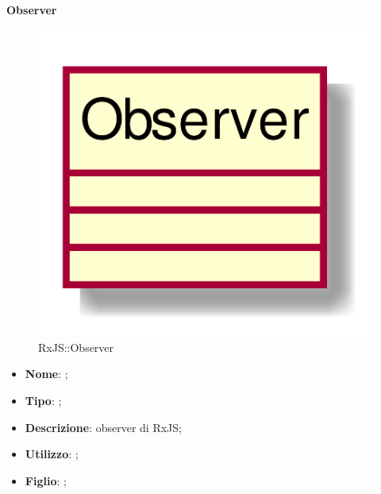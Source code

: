 \hypertarget{Observer_label}{\paragraph{Observer}}
\begin{figure}[h]
	\centering
	\includegraphics[width=\textwidth,height=\textheight,keepaspectratio]{images/ClassObserver.png}
	\caption{RxJS::Observer}
\end{figure}
\begin{itemize}
	\item \textbf{Nome}: ;
	\item \textbf{Tipo}: ;
	\item \textbf{Descrizione}: observer di RxJS;
	\item \textbf{Utilizzo}: ;
	\item \textbf{Figlio}: ;
\end{itemize}
\FloatBarrier

